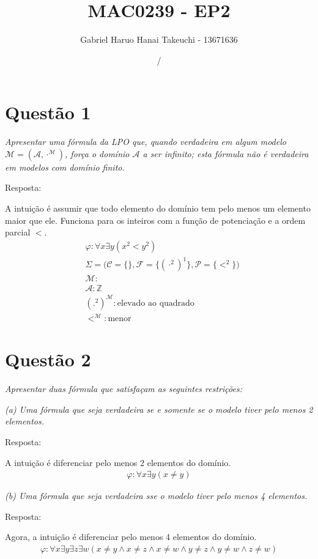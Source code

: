 \documentclass{article}
\title{MAC0239 - EP2}
\author{Gabriel Haruo Hanai Takeuchi - 13671636}
\date{\the\month/\the\year}
\begin{document}
\maketitle

\section*{Questão 1}
\textit{Apresentar  uma fórmula da LPO  que, quando verdadeira em algum modelo $\mathcal{M} = (\mathcal{A}, \cdot^\mathcal{M})$, força o  domínio $\mathcal{A}$ a ser  infinito; esta fórmula não é verdadeira em modelos com domínio finito.}

\medskip
Resposta:

A intuição é assumir que todo elemento do domínio tem pelo menos um elemento maior que ele.
Funciona para os inteiros com a função de potenciação e a ordem parcial $<$.
\begin{align*}
	&\varphi: \forall x \exists y ( x^2 < y^2 )\\
	&\Sigma = \Big( \mathcal{C} = \{\} ,\mathcal{F} = \{ (\cdot ^2)^1\}, \mathcal{P} = \{ <^2 \} \Big)\\
	&\mathcal{M}:\\
	&\mathcal{A}: \mathbb{Z}\\
	&(.^2)^\mathcal{M}: \text{elevado ao quadrado}\\
	&<^\mathcal{M}: \text{menor}
\end{align*}

\section*{Questão 2}
\textit{Apresentar duas fórmula que satisfaçam as seguintes restrições:}

\textit{(a) Uma fórmula que seja verdadeira se e somente se o modelo tiver pelo menos 2 elementos.}

\medskip
Resposta:

A intuição é diferenciar pelo menos 2 elementos do domínio.
\begin{align*}
	\varphi: \forall x \exists y (x \neq y)
\end{align*}

\textit{(b) Uma fórmula que seja verdadeira sse o modelo tiver pelo menos 4 elementos.}

\medskip
Resposta:

Agora, a intuição é diferenciar pelo menos 4 elementos do domínio.
\begin{align*}
	\varphi: \forall x \exists y \exists z \exists w (x \neq y \wedge x \neq z \wedge x \neq w \wedge y \neq z \wedge y \neq w \wedge z \neq w)
\end{align*}
\end{document}
